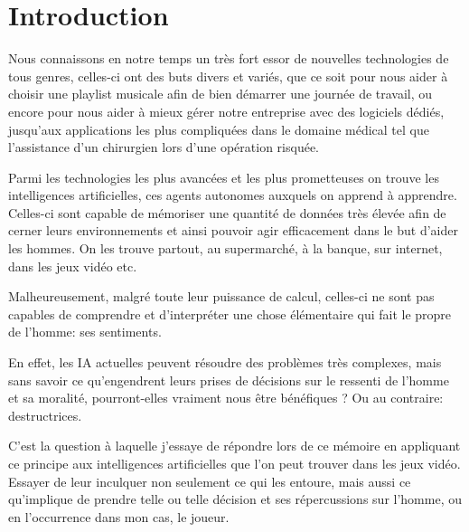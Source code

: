 
\chapter{Introduction} %

\label{Chapter1} %


\newcommand{\keyword}[1]{\textbf{#1}}
\newcommand{\tabhead}[1]{\textbf{#1}}
\newcommand{\code}[1]{\texttt{#1}}
\newcommand{\file}[1]{\texttt{\bfseries#1}}
\newcommand{\option}[1]{\texttt{\itshape#1}}

Nous connaissons en notre temps un très fort essor de nouvelles technologies de tous genres, celles-ci ont des buts divers et variés, que ce soit pour nous aider à choisir une playlist musicale afin de bien démarrer une journée de travail, ou encore pour nous aider à mieux gérer notre entreprise avec des logiciels dédiés,  jusqu'aux applications les plus compliquées dans le domaine médical tel que l'assistance d'un chirurgien lors d'une opération risquée.

Parmi les technologies les plus avancées et les plus prometteuses on trouve les intelligences artificielles, ces agents autonomes auxquels on apprend à apprendre. Celles-ci sont capable de mémoriser une quantité de données très élevée afin de cerner leurs environnements et ainsi pouvoir agir efficacement dans le but d'aider les hommes. On les trouve partout, au supermarché, à la banque, sur internet, dans les jeux 
vidéo etc.

Malheureusement, malgré toute leur puissance de calcul, celles-ci ne sont pas capables de comprendre et d'interpréter une chose élémentaire qui fait le propre de l'homme: ses sentiments.

En effet, les IA actuelles peuvent résoudre des problèmes très complexes, mais sans savoir ce qu'engendrent leurs prises de décisions sur le ressenti de l'homme et sa moralité, pourront-elles vraiment nous être bénéfiques ? Ou au contraire: destructrices.

C'est la question à laquelle j'essaye de répondre lors de ce mémoire en appliquant ce principe aux intelligences artificielles que l'on peut trouver dans les jeux vidéo. Essayer de leur inculquer non seulement ce qui les entoure, mais aussi ce qu'implique de prendre telle ou telle décision et ses répercussions sur l'homme, ou en l'occurrence dans mon cas, le joueur.

